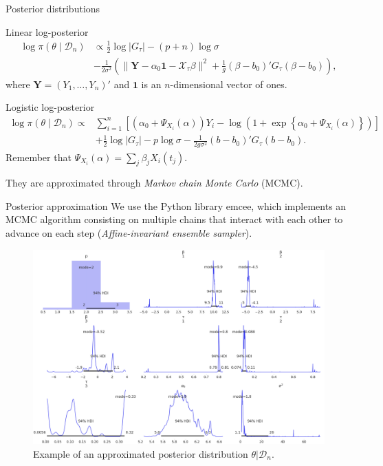 \documentclass[10pt, english, professionalfonts]{beamer}
\newcommand\maroon[1]{\color{mLightBrown}#1\color{mDarkTeal}}
\begin{document}
\begin{frame}{Posterior distributions}
  \begin{block}{Linear log-posterior}
    \vspace{-1em}
    \begin{align*}
  \log \pi(\theta\mid \mathcal D_n) &\propto \frac{1}{2}\log |G_\tau| - (p+n)\log \sigma\\
  &-\frac{1}{2\sigma^2} \left(\|\boldsymbol{Y}-\alpha_0\boldsymbol{1} - \mathcal X_\tau\beta\|^2 + \frac{1}{g}(\beta - b_0)'G_\tau(\beta - b_0) \right),
\end{align*}
where \(\bm Y=(Y_1,\dots,Y_n)'\) and \(\bm{1}\) is an \(n\)-dimensional vector of ones.
  \end{block}
  \vspace{1em}
  \begin{block}{Logistic log-posterior}
      \vspace{-1em}
    \begin{align*}
  \log \pi(\theta \mid \mathcal D_n) \propto {} & \sum_{i=1}^n \left[ \left(\alpha_0 + \Psi_{X_i}(\alpha)\right)Y_i - \log\left(1 + \exp\left\{\alpha_0 + \Psi_{X_i}(\alpha)\right\}\right)\right]\\
  \quad &+ \frac{1}{2}\log |G_\tau| - p\log \sigma -\frac{1}{2g\sigma^2} (b - b_0)'G_\tau(b - b_0).
\end{align*}
Remember that \(\Psi_{X_i}(\alpha) = \sum_j \beta_j X_i(t_j)\).
  \end{block}
  They are approximated through \textit{Markov chain Monte Carlo} (MCMC).
\end{frame}

\begin{frame}{Posterior approximation}
 We use the Python library \maroon{emcee}, which implements an MCMC algorithm consisting on multiple chains that interact with each other to advance on each step (\textit{Affine-invariant ensemble sampler}).

  \vspace{1em}

  \begin{figure}
    \includegraphics[width=.7\textwidth]{img/posterior}
    \caption{Example of an approximated posterior distribution \(\theta|\mathcal D_n\).}
  \end{figure}
\end{frame}
\end{document}
